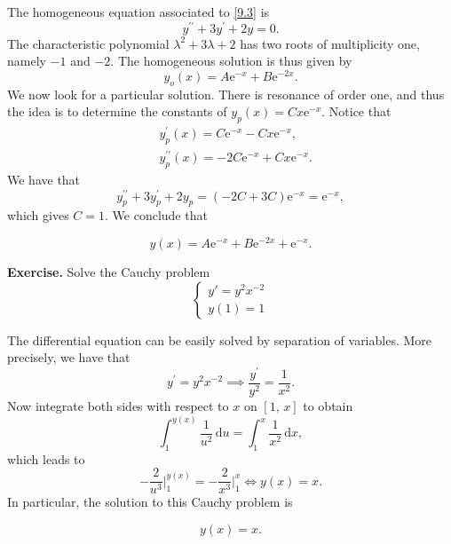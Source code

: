 \documentclass[a4paper,10 pt]{report}
\newcommand{\finalanswer}[1]{%
    \begin{finalAnswer}
    \[
        #1
    \]
    \end{finalAnswer}
}
\theoremstyle{definition}
\begin{document}
\begin{solutionBox} The homogeneous equation associated to \eqref{9.3} is
\begin{equation} \label{9.3.1} y^{\prime \prime} + 3y^\prime + 2y = 0. \end{equation}
The characteristic polynomial $\lambda^2 + 3 \lambda + 2$ has two roots of multiplicity one, namely $-1$ and $-2$. The homogeneous solution is thus given by
\begin{equation*} y_o(x) = A \mathrm{e}^{-x} + B \mathrm{e}^{-2x}. \end{equation*}
We now look for a particular solution. There is resonance of order one, and thus the idea is to determine the constants of $y_p(x) = Cx \mathrm{e}^{-x}$. Notice that
\begin{equation*}\begin{aligned} & y_p^\prime(x) = C \mathrm{e}^{-x} - C x \mathrm{e}^{-x},
\\[1em] & y_p^{\prime \prime}(x) = - 2C \mathrm{e}^{-x} + C x \mathrm{e}^{-x}. \end{aligned} \end{equation*}
We have that
\begin{equation*} y_p^{\prime \prime} + 3y_p^\prime + 2y_p = (- 2C + 3C) \mathrm{e}^{-x} =  \mathrm{e}^{-x}, \end{equation*}
which gives $C = 1$. We conclude that
\finalanswer{
y(x) = A \mathrm{e}^{-x} + B \mathrm{e}^{-2x} + \mathrm{e}^{-x}.
}
\end{solutionBox}

\begin{exerciseBox} \textbf{Exercise.}  Solve the Cauchy problem
\[
\begin{cases} y' = y^2 x^{-2}\\ y(1) = 1\end{cases}\]
\end{exerciseBox}

\begin{solutionBox} The differential equation can be easily solved by separation of variables. More precisely, we have that
\begin{equation*}y^\prime = y^2 x^{-2} \implies \frac{y^\prime}{y^2} = \frac{1}{x^2}. \end{equation*}
Now integrate both sides with respect to $x$ on $[1, \, x]$ to obtain
\begin{equation*}\int_1^{y(x)}  \frac{1}{u^2} \, \mathrm{d}u = \int_1^x \frac{1}{x^2} \, \mathrm{d}x, \end{equation*}
which leads to
\begin{equation*}- \frac{2}{u^3} \big|_{1}^{y(x)} = - \frac{2}{x^3} \big|_{1}^{x} \iff y(x) = x.\end{equation*}
In particular, the solution to this Cauchy problem is
\finalanswer{
y(x) = x.
}
\end{solutionBox}
\end{document}
